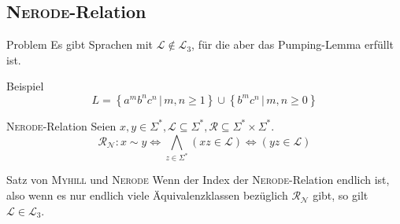 \documentclass[]{beamer}
\begin{document}
\subsection{\textsc{Nerode}-Relation}
\begin{frame}[squeeze]{}
  \begin{alertblock}{Problem}
    Es gibt Sprachen mit $\mathcal{L} \notin \mathcal{L}_3$, für die aber das Pumping-Lemma erfüllt ist.
  \end{alertblock}
  
  \pause
  
  \begin{block}{Beispiel}
    \[L = \left\{ a^m b^n c^n \, | \, m, n \geq 1 \right\} \cup \left\{ b^m c^n \, | \, m, n \geq 0 \right\}\]
  \end{block}
  
  \pause  
  
  \begin{exampleblock}{\textsc{Nerode}-Relation}
    Seien $x, y \in \Sigma^*, \mathcal{L} \subseteq \Sigma^*, \mathcal{R} \subseteq \Sigma^* \times \Sigma^*$.
    \[\mathcal{R_N} : x \sim y \Leftrightarrow \underset{z \in \Sigma^*}{\bigwedge} (xz \in \mathcal{L}) \Leftrightarrow (yz \in \mathcal{L})\]
  \end{exampleblock}
  
  \pause
  
  \begin{block}{Satz von \textsc{Myhill} und \textsc{Nerode}}
    Wenn der Index der \textsc{Nerode}-Relation endlich ist, also wenn es nur endlich viele Äquivalenzklassen bezüglich $\mathcal{R_N}$ gibt, so gilt $\mathcal{L} \in \mathcal{L}_3$.
  \end{block}
\end{frame}
\end{document}
